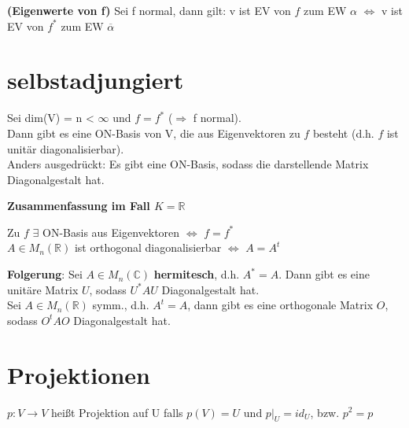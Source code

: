 \begin{theorem} \textbf{(Eigenwerte von f)}
Sei f normal, dann gilt: v ist EV von $f$  zum EW $\alpha$ $\Leftrightarrow$ v ist EV von $f^*$ zum EW $\overline{\alpha}$
\end{theorem}

\section{selbstadjungiert}
\begin{lemma}
Sei dim(V) = n < $\infty$ und $f = f^*$ ($\Rightarrow$ f normal).\\
Dann gibt es eine ON-Basis von V, die aus Eigenvektoren zu $f$ besteht (d.h. $f$ ist unitär diagonalisierbar).\\
Anders ausgedrückt: Es gibt eine ON-Basis, sodass die darstellende Matrix Diagonalgestalt hat.

\textbf{Zusammenfassung im Fall $K=\mathbb{R}$}
\begin{lemma}
Zu $f$ $\exists$ ON-Basis aus Eigenvektoren $\Leftrightarrow$ $f = f^*$\\
$A \in M_n(\mathbb{R})$ ist orthogonal diagonalisierbar $\Leftrightarrow$ $A = A^t$
\end{lemma}

\textbf{Folgerung}: Sei $A \in M_n(\mathbb{C})$ \textbf{hermitesch}, d.h. $A^*=A$. Dann gibt es eine unitäre Matrix $U$, sodass $U^*AU$ Diagonalgestalt hat.\\
Sei $A \in M_n(\mathbb{R})$ symm., d.h. $A^t=A$, dann gibt es eine orthogonale Matrix $O$, sodass $O^tAO$ Diagonalgestalt hat.
\end{lemma}

\section{Projektionen}
\begin{definition}
$p: V \to V$ heißt Projektion auf U falls $p(V) = U$ und $p|_U = id_U$, bzw. $p^2 = p$
\end{definition}

